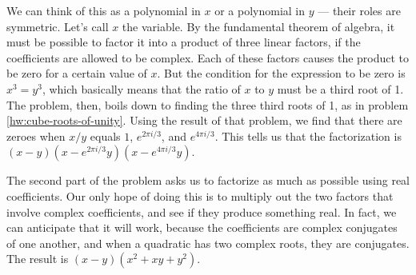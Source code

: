 We can think of this as a polynomial in $x$ or a polynomial in $y$ --- their roles are symmetric. Let's call $x$ the variable.
By the fundamental theorem of algebra, it must be possible to factor it into a product of three
linear factors, if the coefficients are allowed to be complex. Each of these factors causes the
product to be zero for a certain value of $x$. But the condition for the expression to be
zero is $x^3=y^3$, which basically means that the ratio of $x$ to $y$ must be a third root of 1.
The problem, then, boils down to finding the three third roots of 1, as in
problem \ref{hw:cube-roots-of-unity}. Using the result of that problem, we find that there
are zeroes when $x/y$ equals $1$, $e^{2\pi i/3}$, and $e^{4\pi i/3}$. This tells us that
the factorization is $(x-y)(x-e^{2\pi i/3}y)(x-e^{4\pi i/3}y)$.

The second part of the problem asks us to factorize as much as possible using real coefficients.
Our only hope of doing this is to multiply out the two factors that involve complex coefficients,
and see if they produce something real. In fact, we can anticipate that it will work, because
the coefficients are complex conjugates of one another, and when a quadratic has two complex
roots, they are conjugates. The result is $(x-y)(x^2+xy+y^2)$.

